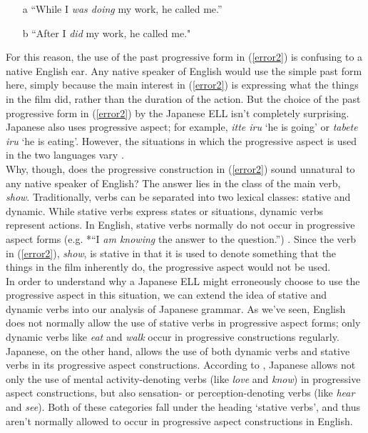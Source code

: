 \documentclass{article}
\begin{document}
\begin{exe}
	\ex
    \label{pastprog}
    \begin{itemize}
    	\item[a]{“While I \textit{was doing} my work, he called me.”}
        \item[b]{“After I \textit{did} my work, he called me."}
    \end{itemize}
\end{exe}
For this reason, the use of the past progressive form in (\ref{error2}) is confusing to a native English ear. Any native speaker of English would use the simple past form here, simply because the main interest in (\ref{error2}) is expressing what the things in the film did, rather than the duration of the action. But the choice of the past progressive form in (\ref{error2}) by the Japanese ELL isn’t completely surprising. Japanese also uses progressive aspect; for example, \textit{itte iru} ‘he is going’ or \textit{tabete iru} ‘he is eating’. However, the situations in which the progressive aspect is used in the two languages vary \citep{Bryant1984}.\\

Why, though, does the progressive construction in (\ref{error2}) sound unnatural to any native speaker of English? The answer lies in the class of the main verb, \textit{show}. Traditionally, verbs can be separated into two lexical classes: stative and dynamic. While stative verbs express states or situations, dynamic verbs represent actions. In English, stative verbs normally do not occur in progressive aspect forms (e.g. *“I \textit{am knowing} the answer to the question.”) \citep{Cowan2008}. Since the verb in (\ref{error2}), \textit{show}, is stative in that it is used to denote something that the things in the film inherently do, the progressive aspect would not be used.\\

In order to understand why a Japanese ELL might erroneously choose to use the progressive aspect in this situation, we can extend the idea of stative and dynamic verbs into our analysis of Japanese grammar. As we’ve seen, English does not normally allow the use of stative verbs in progressive aspect forms; only dynamic verbs like \textit{eat} and \textit{walk} occur in progressive constructions regularly. Japanese, on the other hand, allows the use of both dynamic verbs and stative verbs in its progressive aspect constructions. According to \cite{Bryant1984}, Japanese allows not only the use of mental activity-denoting verbs (like \textit{love} and \textit{know}) in progressive aspect constructions, but also sensation- or perception-denoting verbs (like \textit{hear} and \textit{see}). Both of these categories fall under the heading ‘stative verbs’, and thus aren’t normally allowed to occur in progressive aspect constructions in English.
\end{document}
